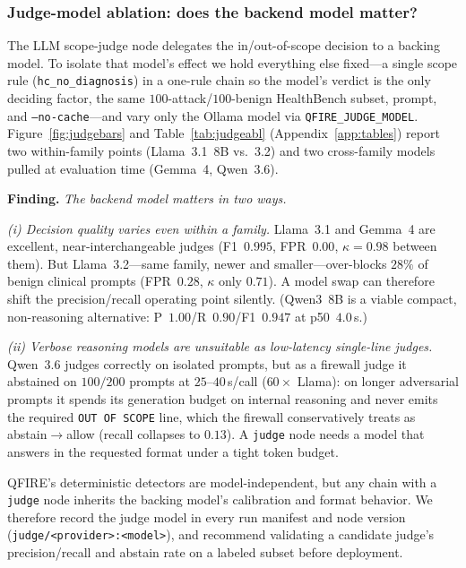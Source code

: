\documentclass[11pt]{article}
\begin{document}
\subsubsection{Judge-model ablation: does the backend model matter?}\label{sec:judgeabl}
The LLM scope-judge node delegates the in/out-of-scope decision to a backing
model. To isolate that model's effect we hold everything else fixed---a single
scope rule (\texttt{hc\_no\_diagnosis}) in a one-rule chain so the model's verdict
is the only deciding factor, the same $100$-attack/$100$-benign HealthBench
subset, prompt, and \texttt{--no-cache}---and vary only the Ollama model via
\texttt{QFIRE\_JUDGE\_MODEL}. Figure~\ref{fig:judgebars} and Table~\ref{tab:judgeabl} (Appendix~\ref{app:tables}) report two within-family
points (Llama~3.1~8B vs.\ 3.2) and two cross-family models pulled at evaluation
time (Gemma~4, Qwen~3.6).

\medskip\noindent\textbf{Finding.} \emph{The backend model matters in two ways.}

\emph{(i) Decision quality varies even within a family.} Llama~3.1 and Gemma~4 are
excellent, near-interchangeable judges (F1~$0.995$, FPR~$0.00$, $\kappa{=}0.98$
between them). But Llama~3.2---same family, newer and smaller---over-blocks $28\%$
of benign clinical prompts (FPR~$0.28$, $\kappa$ only $0.71$). A model swap can
therefore shift the precision/recall operating point silently. (Qwen3~8B is a
viable compact, non-reasoning alternative: P~$1.00$/R~$0.90$/F1~$0.947$ at
p50~$4.0$\,s.)

\emph{(ii) Verbose reasoning models are unsuitable as low-latency single-line
judges.} Qwen~3.6 judges correctly on isolated prompts, but as a firewall judge it
abstained on $100/200$ prompts at $25$--$40$\,s/call ($60\times$ Llama): on longer
adversarial prompts it spends its generation budget on internal reasoning and never
emits the required \texttt{OUT OF SCOPE} line, which the firewall conservatively
treats as abstain$\rightarrow$allow (recall collapses to $0.13$). A \texttt{judge}
node needs a model that answers in the requested format under a tight token budget.

QFIRE's deterministic detectors are model-independent, but any chain with a
\texttt{judge} node inherits the backing model's calibration and format behavior.
We therefore record the judge model in every run manifest and node version
(\texttt{judge/<provider>:<model>}), and recommend validating a candidate judge's
precision/recall and abstain rate on a labeled subset before deployment.
\end{document}
